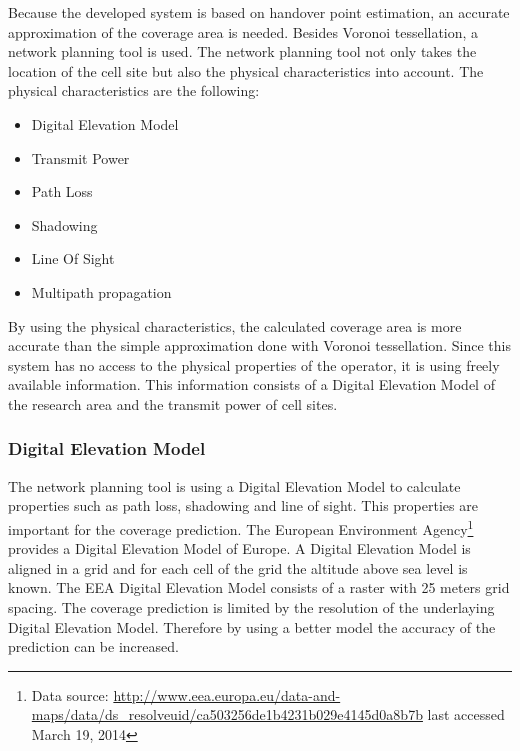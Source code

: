 \documentclass[master,english]{hgbthesis}
\begin{document}
Because the developed system is based on handover point estimation, an accurate approximation of the coverage area is needed. Besides Voronoi tessellation, a network planning tool is used. The network planning tool not only takes the location of the cell site but also the physical characteristics into account. The physical characteristics are the following:

\begin{itemize}

	\item Digital Elevation Model

	\item Transmit Power

	\item Path Loss

	\item Shadowing

	\item Line Of Sight

	\item Multipath propagation

\end{itemize} 

By using the physical characteristics, the calculated coverage area is more accurate than the simple approximation done with Voronoi tessellation. Since this system has no access to the physical properties of the operator, it is using freely available information. This information consists of a Digital Elevation Model of the research area and the transmit power of cell sites. 

\subsubsection{Digital Elevation Model}

The network planning tool is using a Digital Elevation Model to calculate properties such as path loss, shadowing and line of sight. This properties are important for the coverage prediction. The European Environment Agency\footnote{Data source: \url{http://www.eea.europa.eu/data-and-maps/data/ds_resolveuid/ca503256de1b4231b029e4145d0a8b7b} last accessed March 19, 2014} provides a Digital Elevation Model of Europe. A Digital Elevation Model is aligned in a grid and for each cell of the grid the altitude above sea level is known. The EEA Digital Elevation Model consists of a raster with 25 meters grid spacing. The coverage prediction is limited by the resolution of the underlaying Digital Elevation Model. Therefore by using a better model the accuracy of the prediction can be increased. 
\end{document}
